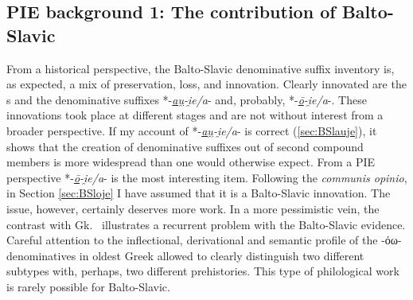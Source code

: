\documentclass[output=paper,colorlinks,citecolor=brown]{langscibook}
\begin{document}
\subsection{PIE background 1: The contribution of Balto-Slavic}
\label{sec:BSlPIEcontribution}

From a historical perspective, the Balto-Slavic denominative suffix inventory is, as expected, a mix of preservation, loss, and innovation. Clearly innovated are the  s and the denominative suffixes *-\textit{\underline{au̯}-i̯e/a}- and, probably, *\nobreakdash-\textit{\underline{ō}-i̯e/a}-. These innovations took place at different stages and are not without interest from a broader perspective. If my account of *-\textit{\underline{au̯}-i̯e/a}- is correct (\ref{sec:BSlauje}), it shows that the creation of denominative suffixes out of second compound members is more widespread than one would otherwise expect. From a PIE perspective *-\textit{\underline{ō}-i̯e/a}- is the most interesting item. Following the \textit{communis opinio}, in Section \ref{sec:BSloje} I have assumed that it is a Balto-Slavic innovation. The issue, however, certainly deserves more work. In a more pessimistic vein, the contrast with Gk.\  illustrates a recurrent problem with the Balto-Slavic evidence. Careful attention to the inflectional, derivational and semantic profile of the -όω-denominatives in oldest Greek allowed \citet[15--22]{Tucker1981} to clearly distinguish two different subtypes with, perhaps, two different prehistories. This type of philological work is rarely possible for Balto-Slavic.
\end{document}
